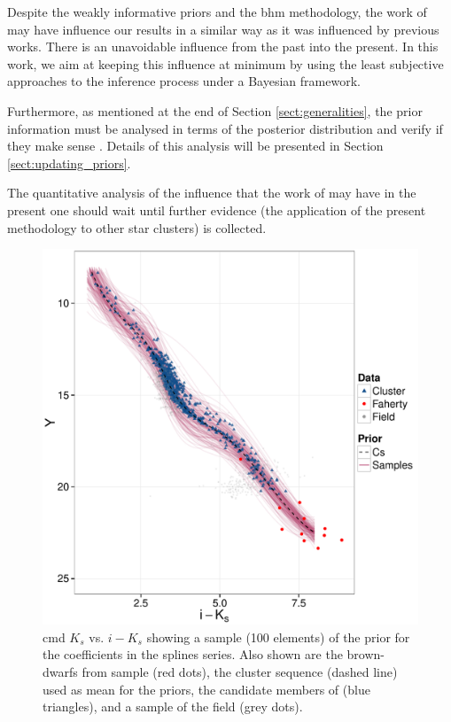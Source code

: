 {Despite the weakly informative priors and the \gls{bhm} methodology, the work of \citet{Bouy2015} may have influence our results in a similar way as it was influenced by previous works. There is an unavoidable influence from the past into the present. In this work, we aim at keeping this influence at minimum by using the least subjective approaches to the inference process under a Bayesian framework.}

{Furthermore, as mentioned at the end of Section \ref{sect:generalities}, the prior information must be analysed in terms of the posterior distribution and verify if they make sense \citep{Gelman2006,Gelman2013}. Details of this analysis will be presented in Section \ref{sect:updating_priors}.}

{The quantitative analysis of the influence that the work of \citet{Bouy2015} may have in the present one should wait until further evidence (the application of the present methodology to other star clusters) is collected.}
 


\begin{figure}[ht!]
\begin{center}
\includegraphics[page=4,width=\textwidth]{background/Figures/Priors_Coefs.pdf}
\caption{\gls{cmd} $K_s$ vs. $i-K_s$ showing a sample (100 elements) of the prior for the coefficients in the splines series. Also shown are the brown-dwarfs from \citet{Faherty2012} sample (red dots), the cluster sequence (dashed line) used as mean for the priors, the candidate members of \citet{Bouy2015} (blue triangles), and a sample of the field (grey dots).}
\label{figure:priorcoefs}
\end{center}
\end{figure}

